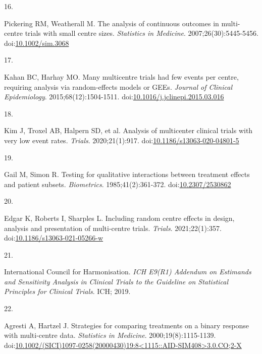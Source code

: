 \documentclass[
  11pt,
]{article}
\newlength{\cslhangindent}
\newlength{\csllabelwidth}
\newenvironment{CSLReferences}[2] %
 {\begin{list}{}{%
  \setlength{\itemindent}{0pt}
  \setlength{\leftmargin}{0pt}
  \setlength{\parsep}{0pt}
  \ifodd #1
   \setlength{\leftmargin}{\cslhangindent}
   \setlength{\itemindent}{-1\cslhangindent}
  \fi
  \setlength{\itemsep}{#2\baselineskip}}}
 {\end{list}}
\newcommand{\CSLLeftMargin}[1]{\parbox[t]{\csllabelwidth}{\strut#1\strut}}
\newcommand{\CSLRightInline}[1]{\parbox[t]{\linewidth - \csllabelwidth}{\strut#1\strut}}
\begin{document}
\begin{CSLReferences}{0}{1}
\CSLLeftMargin{16. }%
\CSLRightInline{Pickering RM, Weatherall M. The analysis of continuous outcomes in multi-centre trials with small centre sizes. \emph{Statistics in Medicine}. 2007;26(30):5445-5456. doi:\href{https://doi.org/10.1002/sim.3068}{10.1002/sim.3068}}

\CSLLeftMargin{17. }%
\CSLRightInline{Kahan BC, Harhay MO. Many multicentre trials had few events per centre, requiring analysis via random-effects models or {GEEs}. \emph{Journal of Clinical Epidemiology}. 2015;68(12):1504-1511. doi:\href{https://doi.org/10.1016/j.jclinepi.2015.03.016}{10.1016/j.jclinepi.2015.03.016}}

\CSLLeftMargin{18. }%
\CSLRightInline{Kim J, Troxel AB, Halpern SD, et al. Analysis of multicenter clinical trials with very low event rates. \emph{Trials}. 2020;21(1):917. doi:\href{https://doi.org/10.1186/s13063-020-04801-5}{10.1186/s13063-020-04801-5}}

\CSLLeftMargin{19. }%
\CSLRightInline{Gail M, Simon R. Testing for qualitative interactions between treatment effects and patient subsets. \emph{Biometrics}. 1985;41(2):361-372. doi:\href{https://doi.org/10.2307/2530862}{10.2307/2530862}}

\CSLLeftMargin{20. }%
\CSLRightInline{Edgar K, Roberts I, Sharples L. Including random centre effects in design, analysis and presentation of multi-centre trials. \emph{Trials}. 2021;22(1):357. doi:\href{https://doi.org/10.1186/s13063-021-05266-w}{10.1186/s13063-021-05266-w}}

\CSLLeftMargin{21. }%
\CSLRightInline{International Council for Harmonisation. \emph{{ICH} {E9(R1)} Addendum on Estimands and Sensitivity Analysis in Clinical Trials to the Guideline on Statistical Principles for Clinical Trials}. ICH; 2019.}

\CSLLeftMargin{22. }%
\CSLRightInline{Agresti A, Hartzel J. Strategies for comparing treatments on a binary response with multi-centre data. \emph{Statistics in Medicine}. 2000;19(8):1115-1139. doi:\href{https://doi.org/10.1002/(SICI)1097-0258(20000430)19:8\%3C1115::AID-SIM408\%3E3.0.CO;2-X}{10.1002/(SICI)1097-0258(20000430)19:8\textless1115::AID-SIM408\textgreater3.0.CO;2-X}}


\end{CSLReferences}
\end{document}
